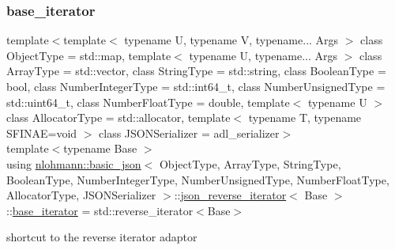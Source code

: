 \subsubsection{\texorpdfstring{base\+\_\+iterator}{base\_iterator}}
{\footnotesize\ttfamily template$<$template$<$ typename U, typename V, typename... Args $>$ class Object\+Type = std\+::map, template$<$ typename U, typename... Args $>$ class Array\+Type = std\+::vector, class String\+Type  = std\+::string, class Boolean\+Type  = bool, class Number\+Integer\+Type  = std\+::int64\+\_\+t, class Number\+Unsigned\+Type  = std\+::uint64\+\_\+t, class Number\+Float\+Type  = double, template$<$ typename U $>$ class Allocator\+Type = std\+::allocator, template$<$ typename T, typename S\+F\+I\+N\+A\+E=void $>$ class J\+S\+O\+N\+Serializer = adl\+\_\+serializer$>$ \\
template$<$typename Base $>$ \\
using \hyperlink{classnlohmann_1_1basic__json}{nlohmann\+::basic\+\_\+json}$<$ Object\+Type, Array\+Type, String\+Type, Boolean\+Type, Number\+Integer\+Type, Number\+Unsigned\+Type, Number\+Float\+Type, Allocator\+Type, J\+S\+O\+N\+Serializer $>$\+::\hyperlink{classnlohmann_1_1basic__json_1_1json__reverse__iterator}{json\+\_\+reverse\+\_\+iterator}$<$ Base $>$\+::\hyperlink{classnlohmann_1_1basic__json_1_1json__reverse__iterator_a5b7f3c5d86fe89a65d9552c1cac37261}{base\+\_\+iterator} =  std\+::reverse\+\_\+iterator$<$Base$>$}



shortcut to the reverse iterator adaptor 

\mbox{\label{classnlohmann_1_1basic__json_1_1json__reverse__iterator_ab0021ef2007fd338615360af404dcd4e}} 
